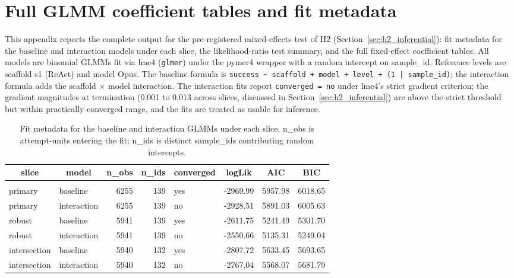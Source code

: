 \documentclass[10pt]{article} %
\begin{document}
\section{Full GLMM coefficient tables and fit metadata}\label{app:glmm_full}

    This appendix reports the complete output for the pre-registered mixed-effects test of H2 (Section~\ref{sec:h2_inferential}): fit metadata for the baseline and interaction models under each slice, the likelihood-ratio test summary, and the full fixed-effect coefficient tables. All models are binomial GLMMs fit via lme4 (\texttt{glmer}) under the pymer4 wrapper with a random intercept on sample\_id. Reference levels are scaffold s1 (ReAct) and model Opus. The baseline formula is \texttt{success \textasciitilde{} scaffold + model + level + (1 | sample\_id)}; the interaction formula adds the scaffold $\times$ model interaction. The interaction fits report \texttt{converged = no} under lme4's strict gradient criterion; the gradient magnitudes at termination (0.001 to 0.013 across slices, discussed in Section~\ref{sec:h2_inferential}) are above the strict threshold but within practically converged range, and the fits are treated as usable for inference.

    \begin{table}[h]
        \caption{Fit metadata for the baseline and interaction GLMMs under each slice. n\_obs is attempt-units entering the fit; n\_ids is distinct sample\_ids contributing random intercepts.}
    \label{tab:glmm_fit_metadata}
    \begin{center}
    \small
    \begin{tabular}{llrrlrrr}
        \multicolumn{1}{c}{\bf slice} & \multicolumn{1}{c}{\bf model} & \multicolumn{1}{c}{\bf n\_obs} & \multicolumn{1}{c}{\bf n\_ids} & \multicolumn{1}{c}{\bf converged} & \multicolumn{1}{c}{\bf logLik} & \multicolumn{1}{c}{\bf AIC} & \multicolumn{1}{c}{\bf BIC} \\
        \hline \\
        primary & baseline & 6255 & 139 & yes & -2969.99 & 5957.98 & 6018.65 \\
        primary & interaction & 6255 & 139 & no & -2928.51 & 5891.03 & 6005.63 \\
        robust & baseline & 5941 & 139 & yes & -2611.75 & 5241.49 & 5301.70 \\
        robust & interaction & 5941 & 139 & no & -2550.66 & 5135.31 & 5249.04 \\
        intersection & baseline & 5940 & 132 & yes & -2807.72 & 5633.45 & 5693.65 \\
        intersection & interaction & 5940 & 132 & no & -2767.04 & 5568.07 & 5681.79 \\
    \end{tabular}
    \end{center}
    \end{table}
\end{document}
